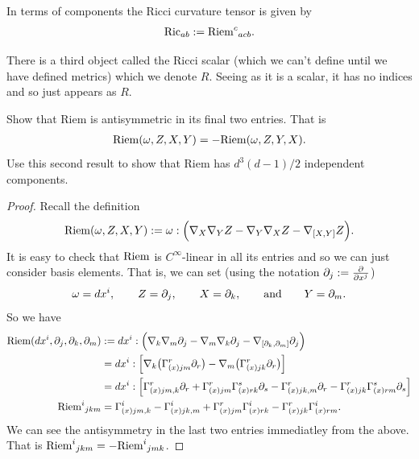 \documentclass[12pt]{article} %
\begin{document}
In terms of components  the Ricci curvature tensor is given by 
\begin{align*}
    \text{Ric}_{ab} := {\mathrm{Riem}^{c}}_{acb}.
\end{align*}

\bnn 
    There is a third object called the Ricci scalar (which we can't define until we have defined metrics) which we denote $R$. Seeing as it is a scalar, it has no indices and so just appears as $R$. 
\enn 

\begin{lema}
   Show that Riem is antisymmetric in its final two entries. That is 
    \begin{align*}
        \mathrm{Riem}(\omega,Z,X,Y) = - \mathrm{Riem}(\omega,Z,Y,X).
    \end{align*}
    Use this second result to show that Riem has $d^3(d-1)/2$ independent components. 
\end{lema}
\begin{proof}
    Recall the definition 
\begin{align*}
    \mathrm{Riem}(\omega,Z,X,Y) := \omega : \Big( \nabla_X\nabla_YZ - \nabla_Y\nabla_XZ - \nabla_{[X,Y]}Z\Big).
\end{align*}
It is easy to check that $\mathrm{Riem}$ is $C^{\infty}$-linear in all its entries and so we can just consider basis elements. That is, we can set (using the notation $\partial_j := \frac{\partial}{\partial x^j}$)
\begin{align*}
    \omega = dx^i, \qquad Z = \partial_j, \qquad X = \partial_k, \qquad\text{and}\qquad Y = \partial_m.
\end{align*}
So we have 
\begin{align*}
    \begin{split}
        \mathrm{Riem}(dx^i,\partial_j,\partial_k,\partial_m) & := dx^i : \Big(\nabla_k\nabla_m\partial_j - \nabla_m\nabla_k\partial_j - \nabla_{[\partial_k,\partial_m]}\partial_j\Big) \\ 
        & = dx^i : \Big[ \nabla_k \big(\Gamma^r_{(x)jm}\partial_r\big) - \nabla_m\big( \Gamma^r_{(x)jk}\partial_r\big) \Big] \\
        & = dx^i : \Big[ \Gamma^r_{(x)jm,k}\partial_r + \Gamma^r_{(x)jm}\Gamma^s_{(x)rk}\partial_s - \Gamma^r_{(x)jk,m}\partial_r - \Gamma^r_{(x)jk}\Gamma^s_{(x)rm}\partial_s \Big] \\
        {\mathrm{Riem}^i}_{jkm} & = \Gamma^i_{(x)jm,k} - \Gamma^i_{(x)jk,m} + \Gamma^r_{(x)jm}\Gamma^i_{(x)rk}  - \Gamma^r_{(x)jk}\Gamma^i_{(x)rm}.
    \end{split}
\end{align*}
We can see the antisymmetry in the last two entries immediatley from the above. That is ${\mathrm{Riem}^i}_{jkm} = -{\mathrm{Riem}^i}_{jmk}$.
\end{proof}
\end{document}
